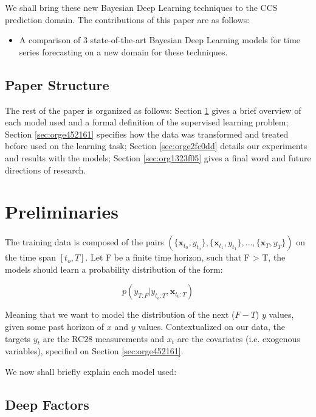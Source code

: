\documentclass[a4paper]{article}
\begin{document}
We shall bring these new Bayesian Deep Learning techniques to the CCS prediction domain. The contributions of this paper are 
as follows: 

\begin{itemize}
\item A comparison of 3 state-of-the-art Bayesian Deep Learning models for time series forecasting on a new domain for these techniques.
\end{itemize}

\subsection{Paper Structure}
\label{sec:org4637cc7}
The rest of the paper is organized as follows:  Section \ref{sec:org043fe2d} gives a brief overview of each model used and a formal definition of the supervised learning problem; Section \ref{sec:orge452161} specifies how the data was transformed and treated before 
used on the learning task; Section \ref{sec:orge2fc0dd} details our experiments and results with the models; Section \ref{sec:org1323f05} gives a final word and future directions of research. 
\section{Preliminaries}
\label{sec:org043fe2d}

The training data is composed of the pairs \((\{\textbf{x}_{t_0},y_{t_o}\},\{\textbf{x}_{t_1},y_{t_1}\}, \dots, \{\textbf{x}_{T},y_{T}\})\) on the time span \([t_o,T]\). 
Let F be a finite time horizon, such that F > T, the models should learn a probability distribution of the form:

\begin{equation}
p(y_{T:F} | y_{t_{o}:T},\textbf{x}_{t_{0}:T}) 
\end{equation} 

Meaning that we want to model the distribution of the next (\(F-T\)) \(y\) values, given some past horizon of \(x\) and \(y\) values. Contextualized on our data, the targets \(y_t\)
are the RC28 measurements and \(x_t\) are the covariates (i.e. exogenous variables), specified on Section \ref{sec:orge452161}.

We now shall briefly explain each model used:

\subsection{Deep Factors \cite{deepfactors}}
\label{sec:org7cac535}
\end{document}
